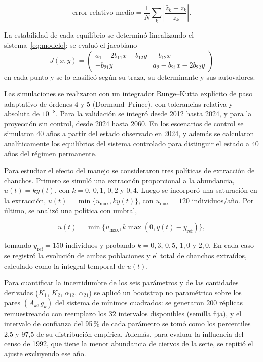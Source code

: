 \documentclass[11pt,a4paper]{article}
\begin{document}
\[
\text{error relativo medio}
=
\frac{1}{N}\sum_k
\left|
\frac{\hat z_k-z_k}{z_k}
\right|.
\]

La estabilidad de cada equilibrio se determinó linealizando el
sistema~\eqref{eq:modelo}: se evaluó el jacobiano
\[
J(x,y)=\begin{pmatrix}
a_1-2b_{11}x-b_{12}y & -b_{12}x\\
-b_{21}y & a_2-b_{21}x-2b_{22}y
\end{pmatrix}
\]
en cada punto y se lo clasificó según su traza, su determinante y sus
autovalores.

Las simulaciones se realizaron con un integrador Runge--Kutta explícito de
paso adaptativo de órdenes 4 y 5 (Dormand--Prince), con tolerancias relativa
y absoluta de $10^{-8}$. Para la validación se integró desde 2012 hasta 2024,
y para la proyección sin control, desde 2024 hasta 2060. En los escenarios de
control se simularon 40 años a partir del estado observado en 2024, y además
se calcularon analíticamente los equilibrios del sistema controlado para
distinguir el estado a 40 años del régimen permanente.


Para estudiar el efecto del manejo se consideraron tres políticas de extracción de chanchos. Primero se simuló una extracción proporcional a la abundancia, $u(t)=ky(t)$, con $k=0$, $0{,}1$, $0{,}2$ y $0{,}4$. Luego se incorporó una saturación en la extracción, $u(t)=\min\{u_{\max},ky(t)\}$, con $u_{\max}=120$ individuos/año. Por último, se analizó una política con umbral,

\[
u(t)=\min\{u_{\max},k\max(0,y(t)-y_{\mathrm{ref}})\},
\]

tomando $y_{\mathrm{ref}}=150$ individuos y probando $k=0{,}3$, $0{,}5$, $1{,}0$ y $2{,}0$. En cada caso se registró la evolución de ambas poblaciones y el total de chanchos extraídos, calculado como la integral temporal de $u(t)$.

Para cuantificar la incertidumbre de los seis parámetros y de las cantidades
derivadas ($K_1$, $K_2$, $\alpha_{12}$, $\alpha_{21}$) se aplicó un bootstrap
no paramétrico sobre los pares $(A_k,g_k)$ del sistema de mínimos cuadrados:
se generaron $200$ réplicas remuestreando con reemplazo los $32$ intervalos
disponibles (semilla fija), y el intervalo de confianza del 95\,\% de cada
parámetro se tomó como los percentiles 2,5 y 97,5 de su distribución
empírica. Además, para evaluar la influencia del censo de 1992, que tiene la
menor abundancia de ciervos de la serie, se repitió el ajuste excluyendo ese
año.
\end{document}
